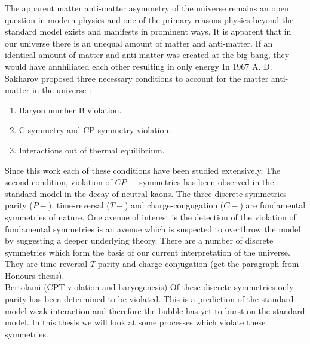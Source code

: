 \documentclass[10pt,a4paper, twoside, openright]{report}
\begin{document}
\linebreak
The apparent matter anti-matter asymmetry of the universe remains an open question in modern physics and one of the primary reasons physics beyond the standard model exists and manifests in prominent ways.  It is apparent that in our universe there is an unequal amount of matter and anti-matter. If an identical amount of matter and anti-matter was created at the big bang, they would have annhiliated each other resulting in only energy
In 1967 A. D. Sakharov proposed three necessary conditions to account for the matter anti-matter in the universe \cite{Sakharov1967}:
\begin{enumerate}
\item Baryon number B violation.
\item  C-symmetry and CP-symmetry violation.
\item Interactions out of thermal equilibrium.
\end{enumerate}
Since this work each of these conditions have been studied extensively. The second condition, violation of $CP-$ symmetries has been observed in the standard model in the decay of neutral kaons. 
The three discrete symmetries parity ($P-$), time-reversal ($T-$) and charge-congugation ($C-$) are fundamental symmetries of nature. 
One avenue of interest is the detection of the violation of fundamental symmetries is an avenue which is suspected to overthrow the model by suggesting a deeper underlying theory.  There are a number of discrete symmetries which form the basis of our current interpretation of the universe. They are time-reversal $T$ parity and charge conjugation (get the paragraph from Honours thesis). \\
Bertolami (CPT violation and baryogenesis)
Of these discrete symmetries only parity has been determined to be violated. This is a prediction of the standard model weak interaction and therefore the bubble has yet to burst on the standard model. In this thesis we will look at some processes which violate these symmetries. \\
\linebreak
\end{document}
